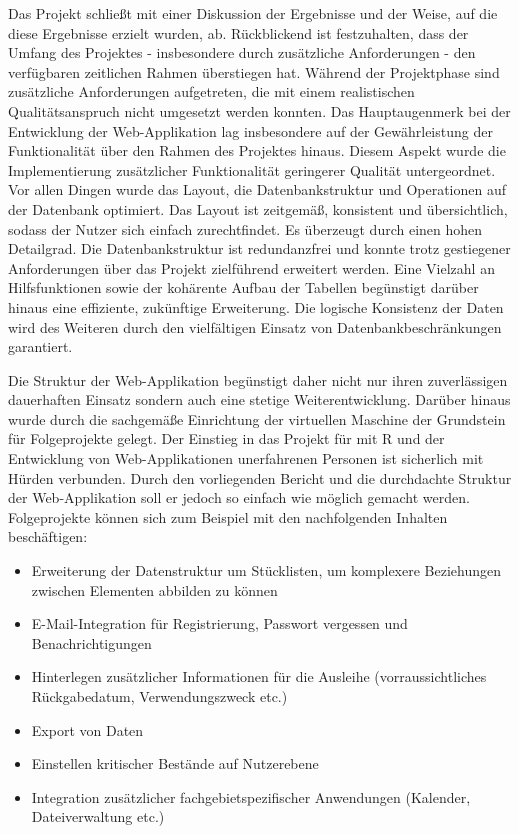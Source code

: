 \documentclass[
]{article}
\providecommand{\tightlist}{%
  \setlength{\itemsep}{0pt}\setlength{\parskip}{0pt}}
\begin{document}
Das Projekt schließt mit einer Diskussion der Ergebnisse und der Weise, auf die diese Ergebnisse erzielt wurden, ab. Rückblickend ist festzuhalten, dass der Umfang des Projektes - insbesondere durch zusätzliche Anforderungen - den verfügbaren zeitlichen Rahmen überstiegen hat. Während der Projektphase sind zusätzliche Anforderungen aufgetreten, die mit einem realistischen Qualitätsanspruch nicht umgesetzt werden konnten. Das Hauptaugenmerk bei der Entwicklung der Web-Applikation lag insbesondere auf der Gewährleistung der Funktionalität über den Rahmen des Projektes hinaus. Diesem Aspekt wurde die Implementierung zusätzlicher Funktionalität geringerer Qualität untergeordnet. Vor allen Dingen wurde das Layout, die Datenbankstruktur und Operationen auf der Datenbank optimiert. Das Layout ist zeitgemäß, konsistent und übersichtlich, sodass der Nutzer sich einfach zurechtfindet. Es überzeugt durch einen hohen Detailgrad. Die Datenbankstruktur ist redundanzfrei und konnte trotz gestiegener Anforderungen über das Projekt zielführend erweitert werden. Eine Vielzahl an Hilfsfunktionen sowie der kohärente Aufbau der Tabellen begünstigt darüber hinaus eine effiziente, zukünftige Erweiterung. Die logische Konsistenz der Daten wird des Weiteren durch den vielfältigen Einsatz von Datenbankbeschränkungen garantiert.

Die Struktur der Web-Applikation begünstigt daher nicht nur ihren zuverlässigen dauerhaften Einsatz sondern auch eine stetige Weiterentwicklung. Darüber hinaus wurde durch die sachgemäße Einrichtung der virtuellen Maschine der Grundstein für Folgeprojekte gelegt. Der Einstieg in das Projekt für mit R und der Entwicklung von Web-Applikationen unerfahrenen Personen ist sicherlich mit Hürden verbunden. Durch den vorliegenden Bericht und die durchdachte Struktur der Web-Applikation soll er jedoch so einfach wie möglich gemacht werden. Folgeprojekte können sich zum Beispiel mit den nachfolgenden Inhalten beschäftigen:

\begin{itemize}
\tightlist
\item
  Erweiterung der Datenstruktur um Stücklisten, um komplexere Beziehungen zwischen Elementen abbilden zu können
\item
  E-Mail-Integration für Registrierung, Passwort vergessen und Benachrichtigungen
\item
  Hinterlegen zusätzlicher Informationen für die Ausleihe (vorraussichtliches Rückgabedatum, Verwendungszweck etc.)
\item
  Export von Daten
\item
  Einstellen kritischer Bestände auf Nutzerebene
\item
  Integration zusätzlicher fachgebietspezifischer Anwendungen (Kalender, Dateiverwaltung etc.)
\end{itemize}
\end{document}
